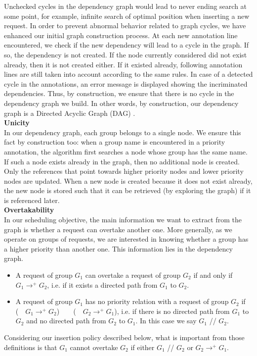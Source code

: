 \documentclass[11pt]{report}
\begin{document}
Unchecked cycles in the dependency graph would lead to never ending search at some point, for example, infinite search of optimal position when inserting a new request. In order to prevent abnormal behavior related to graph cycles, we have enhanced our initial graph construction process. At each new annotation line encountered, we check if the new dependency will lead to a cycle in the graph. If so, the dependency is not created. If the node currently considered did not exist already, then it is not created either. If it existed already, following annotation lines are still taken into account according to the same rules. In case of a detected cycle in the annotations, an error message is displayed showing the incriminated dependencies. Thus, by construction, we ensure that there is no cycle in the dependency graph we build. In other words, by construction, our dependency graph is a Directed Acyclic Graph (DAG) \cite{ref:gallai1968directed}.\\

\textbf{Unicity}\\
In our dependency graph, each group belongs to a single node. We ensure this fact by construction too: when a group name is encountered in a priority annotation, the algorithm first searches a node whose group has the same name. If such a node exists already in the graph, then no additional node is created. Only the references that point towards higher priority nodes and lower priority nodes are updated. When a new node is created because it does not exist already, the new node is stored such that it can be retrieved (by exploring the graph) if it is referenced later.\\

\textbf{Overtakability}\\
In our scheduling objective, the main information we want to extract from the graph is whether a request can overtake another one. More generally, as we operate on groups of requests, we are interested in knowing whether a group has a higher priority than another one. This information lies in the dependency graph.
\begin{itemize}
\item A request of group $G_1$ can overtake a request of group $G_2$ if and only if $G_1\longrightarrow^{+}G_2$, i.e. if it exists a directed path from $G_1$ to $G_2$.
\item A request of group $G_1$ has no priority relation with a request of group $G_2$ if (\lnot~\ $G_1\longrightarrow^{+}G_2$)~\ \wedge~\  (\lnot~\ $G_2\longrightarrow^{+}G_1$), i.e. if there is no directed path from $G_1$ to $G_2$ and no directed path from $G_2$ to $G_1$. In this case we say $G_1$ // $G_2$.
\end{itemize}
Considering our insertion policy described below, what is important from those definitions is that $G_1$ cannot overtake $G_2$ if either $G_1$ // $G_2$ or $G_2\longrightarrow^{+}G_1$.\\
\end{document}
